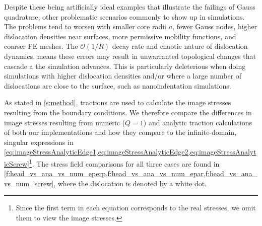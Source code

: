 \documentclass[11pt]{iopart}
\begin{document}
Despite these being artificially ideal examples that illustrate the failings of Gauss quadrature, other problematic scenarios commonly to show up in simulations. The problems tend to worsen with smaller core radii $a$, fewer Gauss nodes, higher dislocation densities near surfaces, more permissive mobility functions, and coarser FE meshes. The $\mathcal{O}(1/R)$ decay rate and chaotic nature of dislocation dynamics, means these errors may result in unwarranted topological changes that cascade a the simulation advances. This is particularly deleterious when doing simulations with higher dislocation densities and/or where a large number of dislocations are close to the surface, such as nanoindentation simulations.

As stated in \cref{s:method}, tractions are used to calculate the image stresses resulting from the boundary conditions. We therefore compare the differences in image stresses resulting from numeric ($Q = 1$) and analytic traction calculations of both our implementations and how they compare to the infinite-domain, singular expressions in \cref{eq:imageStressAnalyticEdge1,eq:imageStressAnalyticEdge2,eq:imageStressAnalyticScrew}\footnote{Since the first term in each equation corresponds to the real stresses, we omit them to view the image stresses.}. The stress field comparisons for all three cases are found in \cref{f:head_vs_ana_vs_num_eperp,f:head_vs_ana_vs_num_epar,f:head_vs_ana_vs_num_screw}, where the dislocation is denoted by a white dot.
\end{document}
